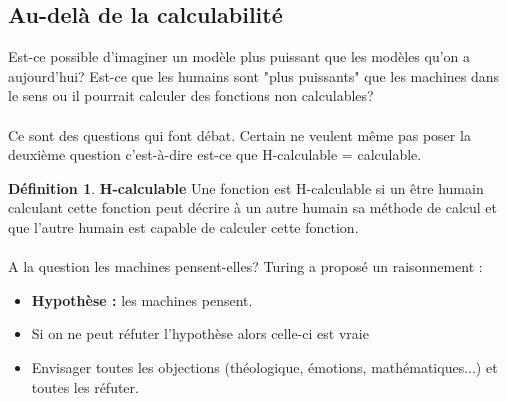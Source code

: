 \documentclass[11pt,a4paper]{article}
\theoremstyle{definition}
\newtheorem{mydef}{Définition}
\begin{document}
\subsection{Au-delà de la calculabilité}
\label{sub:au_del_de_la_calculabilit_}
Est-ce possible d'imaginer un modèle plus puissant que les modèles qu'on a 
aujourd'hui? Est-ce que les humains sont "plus puissants" que les machines dans 
le sens ou il pourrait calculer des fonctions non calculables?

\paragraph{} Ce sont des questions qui font débat. Certain ne veulent même pas 
poser la deuxième question c'est-à-dire est-ce que H-calculable = calculable.

\begin{mydef}
	\textbf{H-calculable}
	Une fonction est H-calculable si un être humain calculant cette 
	fonction peut décrire à un autre humain sa méthode de calcul et que 
	l'autre humain est capable de calculer cette fonction.
\end{mydef}

\paragraph{} A la question les machines pensent-elles? Turing a proposé un 
raisonnement : 
\begin{itemize}
	\item \textbf{Hypothèse :} les machines pensent.
	\item Si on ne peut réfuter l'hypothèse alors celle-ci est vraie
	\item Envisager toutes les objections (théologique, émotions, 
		mathématiques...) et toutes les réfuter.
\end{itemize}

\end{document}
